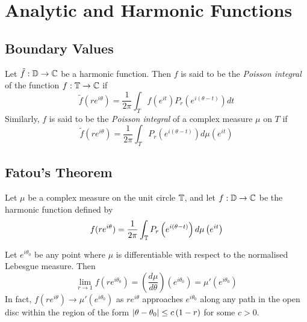 \section{Analytic and Harmonic Functions}
\subsection{Boundary Values}
\begin{definition}
    Let $\tilde{f} : \mathbb D \to \mathbb C$ be a harmonic function. Then $f$ is said to be the \textit{Poisson integral} of the function $f : \mathbb T \to \mathbb C$ if
    \begin{equation*}
	\tilde{f} (re^{i\theta}) = \frac{1}{2\pi} \int_{T} f\left( e^{it} \right) P_{r} \left( e^{i\left( \theta-t \right)} \right) dt
    \end{equation*}
    Similarly, $f$ is said to be the \textit{Poisson integral} of a complex measure $\mu$ on $T$ if
\begin{equation*}
    \tilde{f} (re^{i\theta}) = \frac{1}{2\pi} \int_{T} P_{r} \left( e^{i\left( \theta-t \right)} \right) d\mu\left( e^{it} \right)
    \end{equation*}
    \label{def:Poisson-Integral-Of-Some-Function-Or-Measure}
\end{definition}
\subsection{Fatou's Theorem}

\begin{theorem}
    Let $\mu$ be a complex measure on the unit circle $\mathbb T$, and let $f: \mathbb D \to \mathbb C$ be the harmonic function defined by
    \begin{align*}
	f(re^{i\theta}) = \frac{1}{2\pi} \int_{\mathbb T} P_{r} \left( e^{i\left( \theta-t \right)} \right) d\mu \left( e^{it} \right)
    \end{align*}

    Let $e^{i\theta_{0}}$ be any point where $\mu$ is differentiable with respect to the normalised Lebesgue measure. Then
    \begin{equation*}
	\lim_{r\to 1} f\left( re^{i\theta_{0}} \right) = \left( \frac{d\mu}{d\theta} \right) \left( e^{i\theta _{0}} \right) = \mu ' \left( e^{i\theta _{0}} \right)
    \end{equation*}
    In fact, $f(re^{i\theta}) \to \mu ' \left( e^{i\theta_{0}} \right)$ as $re^{i\theta}$ approaches $e^{i\theta_{0}}$ along any path in the open disc within the region of the form $\left\lvert \theta - \theta_{0} \right\rvert \le c \left( 1-r \right)$ for some $c> 0$. 
    \label{thm:Fatou-1906}
\end{theorem}



